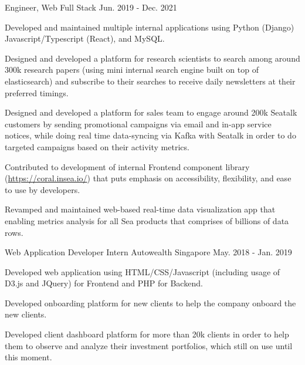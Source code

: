 \begin{cventries}
  \cventry
  {Engineer, Web Full Stack} %
  {} %
  {} %
  {Jun. 2019 - Dec. 2021} %
  {
    \begin{cvitems} %
      \item {Developed and maintained multiple internal applications using Python (Django) Javascript/Typescript (React), and MySQL.}
      \item {Designed and developed a platform for research scientists to search among around 300k research papers (using mini internal search engine built on top of elasticsearch) and subscribe to their searches to receive daily newsletters at their preferred timings.}
      \item {Designed and developed a platform for sales team to engage around 200k Seatalk customers by sending promotional campaigns via email and in-app service notices, while doing real time data-syncing via Kafka with Seatalk in order to do targeted campaigns based on their activity metrics.}
      \item {Contributed to development of internal Frontend component library (\url{https://coral.insea.io/}) that puts emphasis on accessibility, flexibility, and ease to use by developers.}
      \item {Revamped and maintained web-based real-time data visualization app that enabling metrics analysis for all Sea products that comprises of billions of data rows.}
    \end{cvitems}
  }

  \cventry
    {Web Application Developer Intern} %
    {Autowealth} %
    {Singapore} %
    {May. 2018 - Jan. 2019} %
    {
      \begin{cvitems} %
        \item {Developed web application using HTML/CSS/Javascript (including usage of D3.js and JQuery) for Frontend and PHP for Backend.}
        \item {Developed onboarding platform for new clients to help the company onboard the new clients.}
        \item {Developed client dashboard platform for more than 20k clients in order to help them to observe and analyze their investment portfolios, which still on use until this moment.}
      \end{cvitems}
    }

\end{cventries}
